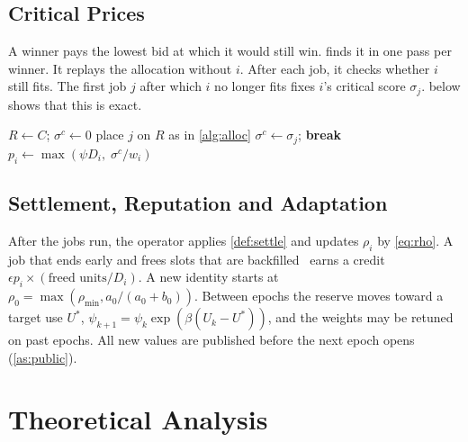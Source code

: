 \documentclass[journal]{IEEEtran}
\theoremstyle{remark}
\begin{document}
\subsection{Critical Prices}
A winner pays the lowest bid at which it would still win.  finds it in one pass per winner. It replays the allocation without $i$. After each job, it checks whether $i$ still fits. The first job $j$ after which $i$ no longer fits fixes $i$'s critical score $\sigma_j$.  below shows that this is exact.

\begin{algorithm}[!t]
\caption{RAVA-Payments (one early-exit scan per winner)}\label{alg:pay}
\begin{algorithmic}[1]
  \State $R\gets C$; $\sigma^c\gets 0$
    \State place $j$ on $R$ as in \cref{alg:alloc}
      \State $\sigma^c\gets\sigma_j$; \textbf{break}
    \EndIf
  \EndFor
  \State $p_i\gets\max(\psi D_i,\;\sigma^c/w_i)$ 
\EndFor
\end{algorithmic}
\end{algorithm}

\subsection{Settlement, Reputation and Adaptation}
After the jobs run, the operator applies \cref{def:settle} and updates $\rho_i$ by \eqref{eq:rho}. A job that ends early and frees slots that are backfilled~\cite{lifka1995,mualem2001} earns a credit $\epsilon p_i\times(\text{freed units}/D_i)$. A new identity starts at $\rho_0=\max(\rho_{\min},a_0/(a_0+b_0))$. Between epochs the reserve moves toward a target use $U^*$, $\psi_{k+1}=\psi_k\exp(\beta(U_k-U^*))$, and the weights may be retuned on past epochs. All new values are published before the next epoch opens (\cref{as:public}).

\section{Theoretical Analysis}\label{sec:theory}
\end{document}
